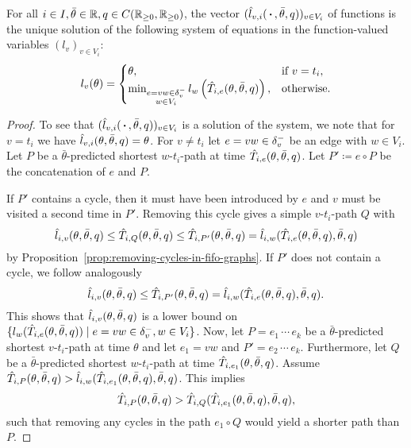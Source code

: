 \begin{proposition}
    For all $i\in I, \bar\theta\in \mathbb{R}, q\in{C}{\left({\mathbb{R}_{\geq0}},{\mathbb{R}_{\geq0}}\right)}$, the vector $(\hat l_{v,i}(\,\boldsymbol{\cdot}\,,\bar\theta, q))_{v\in V_i}$ of functions is the unique solution of the following system of equations in the function-valued variables $(l_v)_{v\in V_i}$:
    \[
        l_v(\theta) = \begin{cases}
            \theta, &\text{if $v = t_i$}, \\
            \min_{\substack{
                e=vw\in\delta^-_{v}\\
                w \in V_i                
            }} l_w\left(
                \hat T_{i, e}(\theta, \bar\theta, q)
            \right), &\text{otherwise}.
        \end{cases}
    \]
\end{proposition}
\begin{proof}
    To see that $(\hat l_{v,i}(\,\boldsymbol{\cdot}\,,\bar\theta, q))_{v\in V_i}$ is a solution of the system, we note that for $v = t_i$ we have $\hat l_{v,i}(\theta, \bar\theta,q) = \theta$.
    For $v\neq t_i$ let $e=vw\in\delta^-_{v}$ be an edge with $w\in V_i$.
    Let $P$ be a $\bar\theta$-predicted shortest $w$-$t_i$-path at time $\hat T_{i,e}(\theta,\bar\theta, q)$.
    Let $P'\coloneqq e\circ P$ be the concatenation of $e$ and $P$.

    If $P'$ contains a cycle, then it must have been introduced by $e$ and $v$ must be visited a second time in $P'$.
    Removing this cycle gives a simple $v$-$t_i$-path $Q$ with 
    \[
        \hat l_{i,v}(\theta,\bar\theta,q) \leq \hat T_{i,Q}(\theta,\bar\theta,q)\leq \hat T_{i,P'}(\theta,\bar\theta,q) = \hat l_{i,w}(\hat T_{i,e}(\theta,\bar\theta, q),\bar\theta,q)
    \]
    by Proposition~\ref{prop:removing-cycles-in-fifo-graphs}.
    If $P'$ does not contain a cycle, we follow analogously
    \[
        \hat l_{i,v}(\theta,\bar\theta,q) \leq \hat T_{i,P'}(\theta,\bar\theta,q) = \hat l_{i,w}(\hat T_{i,e}(\theta,\bar\theta, q),\bar\theta,q).
    \]
    This shows that $\hat l_{i,v}(\theta,\bar\theta,q)$ is a lower bound on $\{ l_w(
        \hat T_{i, e}(\theta, \bar\theta, q)
    ) \mid e=vw\in\delta^-_{v}, w\in V_i  \}$.
    Now, let $P = e_1\, \cdots\, e_k$ be a $\bar\theta$-predicted shortest $v$-$t_i$-path at time $\theta$ and let $e_1=vw$ and $P' = e_2\,\cdots\,e_k$.
    Furthermore, let $Q$ be a $\bar\theta$-predicted shortest $w$-$t_i$-path at time $\hat T_{i,e_1}(\theta,\bar\theta,q)$.
    Assume $\hat T_{i,P}(\theta,\bar\theta, q) > \hat l_{i,w}(\hat T_{i,e_1}(\theta,\bar\theta,q), \bar\theta, q)$.
    This implies
    \[
        \hat T_{i,P}(\theta,\bar\theta, q) > 
        \hat T_{i,Q}(\hat T_{i,e_1}(\theta,\bar\theta,q), \bar\theta, q),
    \]
    such that removing any cycles in the path $e_1\circ Q$ would yield a shorter path than $P$.

\end{proof}

